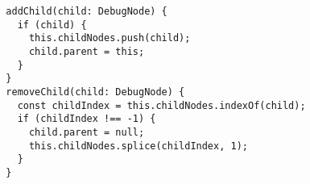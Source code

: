 \begin{verbatim}
  addChild(child: DebugNode) {
    if (child) {
      this.childNodes.push(child);
      child.parent = this;
    }
  }
  removeChild(child: DebugNode) {
    const childIndex = this.childNodes.indexOf(child);
    if (childIndex !== -1) {
      child.parent = null;
      this.childNodes.splice(childIndex, 1);
    }
  }
\end{verbatim}
